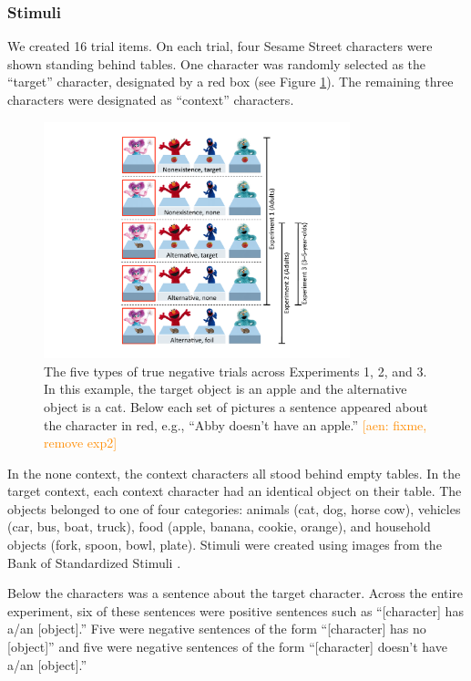 \documentclass[man, noapacite]{apa2}
\newcommand{\aen}[1]{\textcolor{DarkOrange}{[aen: #1]}}
\begin{document}
\subsubsection{Stimuli}

We created 16 trial items. On each trial, four Sesame Street characters were shown standing behind tables. One character was randomly selected as the ``target'' character, designated by a red box (see Figure \ref{fig:trial}). The remaining three characters were designated as ``context'' characters.


\begin{figure}[t]
\begin{center}
\includegraphics[width=3.5in]{figures/trialtypes.pdf}
\caption{\label{fig:trial} The five types of true negative trials across Experiments 1, 2, and 3. In this example, the target object is an apple and the alternative object is a cat. Below each set of pictures a sentence appeared about the character in red, e.g., ``Abby doesn't have an apple.'' \aen{fixme, remove exp2} }
\end{center}
\end{figure}

In the none context, the context characters all stood behind empty tables. In the target context, each context character had an identical object on their table. The objects belonged to one of four categories: animals (cat, dog, horse cow), vehicles (car, bus, boat, truck), food (apple, banana, cookie, orange), and household objects (fork, spoon, bowl, plate). Stimuli were created using images from the Bank of Standardized Stimuli \cite{brodeur2010}.

Below the characters was a sentence about the target character. Across the entire experiment, six of these sentences were positive sentences such as ``[character] has a/an [object].'' Five were negative sentences of the form ``[character] has no [object]'' and five were negative sentences of the form ``[character] doesn't have a/an [object].''
\end{document}
